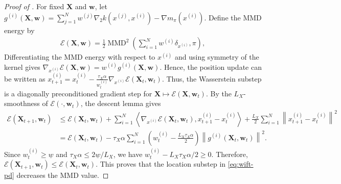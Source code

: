 \begin{proof}[Proof of ]
For fixed $\bm{X}$ and $\bm{w}$, let
$g^{(i)}(\bm{X},\bm{w})=\sum_{j=1}^N w^{(j)}\nabla_2 k(x^{(j)},x^{(i)})-\nabla m_\pi(x^{(i)})$.
Define the MMD energy by
\begin{align}\label{eq:defi_mmd}
\mathcal{E}(\bm{X},\bm{w})
=\frac12\operatorname{MMD}^2\left(\sum_{i=1}^N w^{(i)}\delta_{x^{(i)}},\pi\right),
\end{align}
Differentiating the MMD energy with respect to $x^{(i)}$ and using symmetry of the kernel gives
$\nabla_{x^{(i)}}\mathcal{E}(\bm{X},\bm{w})=w^{(i)} g^{(i)}(\bm{X},\bm{w})$.
Hence, the position update can be written as
$x_{t+1}^{(i)}=x_t^{(i)}-\frac{\tau_X\alpha}{w_t^{(i)}}\nabla_{x^{(i)}}\mathcal{E}(\bm{X}_t,\bm{w}_t)$.
Thus, the Wasserstein substep is a diagonally preconditioned gradient step for $\bm{X}\mapsto\mathcal{E}(\bm{X},\bm{w}_t)$.
By the $L_X$-smoothness of $\mathcal{E}(\cdot,\bm{w}_t)$, the descent lemma gives
\begin{align}
\mathcal{E}(\bm{X}_{t+1},\bm{w}_t)
&\leq
\mathcal{E}(\bm{X}_t,\bm{w}_t)
+
\sum_{i=1}^N
\left\langle
\nabla_{x^{(i)}}\mathcal{E}(\bm{X}_t,\bm{w}_t),
x_{t+1}^{(i)}-x_t^{(i)}
\right\rangle
+
\frac{L_X}{2}
\sum_{i=1}^N
\left\|
x_{t+1}^{(i)}-x_t^{(i)}
\right\|^2
\nonumber\\
&=
\mathcal{E}(\bm{X}_t,\bm{w}_t)
-
\tau_X\alpha
\sum_{i=1}^N
\left(
w_t^{(i)}
-
\frac{L_X\tau_X\alpha}{2}
\right)
\left\|
g^{(i)}(\bm{X}_t,\bm{w}_t)
\right\|^2.
\label{eq:wasserstein-descent}
\end{align}
Since $w_t^{(i)}\geq\underline w$ and $\tau_X\alpha\leq2\underline w/L_X$, we have
$w_t^{(i)}-L_X\tau_X\alpha/2\geq0$. Therefore,
$\mathcal{E}(\bm{X}_{t+1},\bm{w}_t)\leq\mathcal{E}(\bm{X}_t,\bm{w}_t)$. This proves that the location substep in \eqref{eq:wift-pd} decreases the MMD value.


\end{proof}
